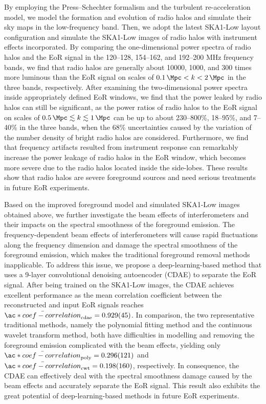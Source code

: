 \begin{englishabstract}
By employing the Press--Schechter formalism and the turbulent
re-acceleration model, we model the formation and evolution of
radio halos and simulate their sky maps in the low-frequency band.
Then, we adopt the latest SKA1-Low layout configuration and simulate
the SKA1-Low images of radio halos with instrument effects incorporated.
By comparing the one-dimensional power spectra of radio halos and
the EoR signal in the \numrange{120}{128}, \numrange{154}{162},
and \numrange{192}{200} \si{\MHz} frequency bands, we find that
radio halos are generally about \num{10000}, 1000, and 300
times more luminous than the EoR signal on scales of
$\SI{0.1}{\per\Mpc} < k < \SI{2}{\per\Mpc}$ in the three bands,
respectively.
After examining the two-dimensional power spectra inside appropriately
defined EoR windows, we find that the power leaked by radio halos can
still be significant, as the power ratios of radio halos to the
EoR signal on scales of
$\SI{0.5}{\per\Mpc} \lesssim k \lesssim \SI{1}{\per\Mpc}$ can be up to
about \numrange{230}{800}\%, \numrange{18}{95}\%, and \numrange{7}{40}\%
in the three bands, when the 68\% uncertainties caused by the variation
of the number density of bright radio halos are considered.
Furthermore, we find that frequency artifacts resulted from instrument
response can remarkably increase the power leakage of radio halos in
the EoR window, which becomes more severe due to the radio halos
located inside the side-lobes.
These results show that radio halos are severe foreground sources
and need serious treatments in future EoR experiments.

Based on the improved foreground model and simulated SKA1-Low images
obtained above, we further investigate the beam effects of
interferometers and their impacts on the spectral smoothness of
the foreground emission.
The frequency-dependent beam effects of interferometers will cause
rapid fluctuations along the frequency dimension and damage the
spectral smoothness of the foreground emission, which makes the
traditional foreground removal methods inapplicable.
To address this issue, we propose a deep-learning-based method
that uses a 9-layer convolutional denoising autoencoder (CDAE) to
separate the EoR signal.
After being trained on the SKA1-Low images, the CDAE achieves excellent
performance as the mean correlation coefficient between 
the reconstructed and input EoR signals reaches
$\bar{\ac*{coef-correlation}}_{\R{cdae}} = \num{0.929 +- 0.045}$.
In comparison, the two representative traditional methods, namely the
polynomial fitting method and the continuous wavelet transform method,
both have difficulties in modelling and removing the foreground emission
complicated with the beam effects, yielding only
$\bar{\ac*{coef-correlation}}_{\R{poly}} = \num{0.296 +- 0.121}$ and
$\bar{\ac*{coef-correlation}}_{\R{cwt}} = \num{0.198 +- 0.160}$,
respectively.
In consequence, the CDAE can effectively deal with the spectral
smoothness damage caused by the beam effects and accurately separate
the EoR signal.
This result also exhibits the great potential of deep-learning-based
methods in future EoR experiments.

\end{englishabstract}
